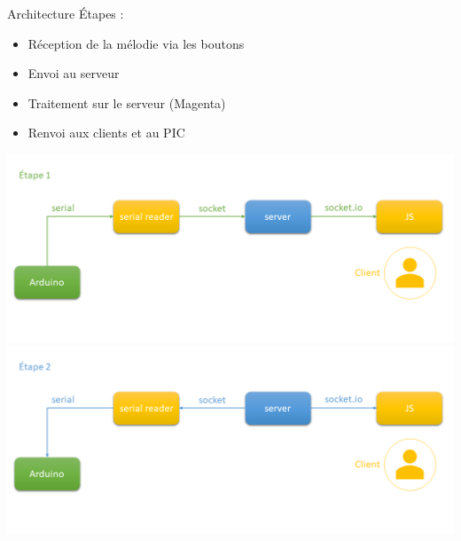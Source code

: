 \documentclass[11pt]{beamer}
\begin{document}
\begin{frame}{Architecture}
Étapes :
\begin{itemize}
    \item Réception de la mélodie via les boutons
    \item Envoi au serveur
    \item Traitement sur le serveur (Magenta)
    \item Renvoi aux clients et au PIC
\end{itemize}
\begin{center}
    \includegraphics[scale=0.23]{etape1.png}
    \includegraphics[scale=0.23]{etape2.png}
\end{center}
\end{frame}


\end{document}
